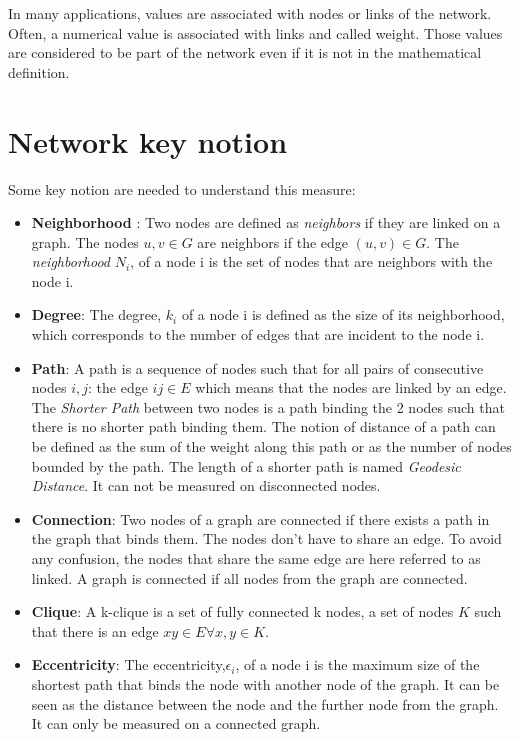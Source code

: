 \documentclass[a4paper, 12pt]{report}
\begin{document}
In many applications, values are associated with nodes or links of the network. Often, a numerical value is associated with links and called weight. Those values are considered to be part of the network even if it is not in the mathematical definition.


\section{Network key notion}

Some key notion are needed to understand this measure:
\begin{itemize}
\item \textbf{Neighborhood} : Two nodes are defined as \textit{neighbors} if they are linked on a graph. The nodes $u,v \in G$ are neighbors if the edge $(u,v) \in G$. The \textit{neighborhood} $N_i$, of a node i is the set of nodes that are neighbors with the node i.

\item \textbf{Degree}: The degree, $k_i$ of a node i is defined as the size of its neighborhood, which corresponds to the number of edges that are incident to the node i.


\item \textbf{Path}: A path is a sequence of nodes such that for all pairs of consecutive nodes $i,j$: the edge $ij \in E$ which means that the nodes are linked by an edge. The \textit{Shorter Path} between two nodes is a path binding the 2 nodes such that there is no shorter path binding them. The notion of distance of a path can be defined as the sum of the weight along this path or as the number of nodes bounded by the path. The length of a shorter path is named \textit{Geodesic Distance}. It can not be measured on disconnected nodes.

\item \textbf{Connection}: Two nodes of a graph are connected if there exists a path in the graph that binds them. The nodes don't have to share an edge. To avoid any confusion, the nodes that share the same edge are here referred to as linked. A graph is connected if all nodes from the graph are connected.

\item \textbf{Clique}: A k-clique is a set of fully connected k nodes, a set of nodes $K$ such that there is an edge $xy \in E \forall x,y \in K $.

\item \textbf{Eccentricity}: The eccentricity,$\epsilon_i$, of a node i is the maximum size of the shortest path that binds the node with another node of the graph. It can be seen as the distance between the node and the further node from the graph. It can only be measured on a connected graph.

\end{itemize}
\citep{diestel}
\end{document}
